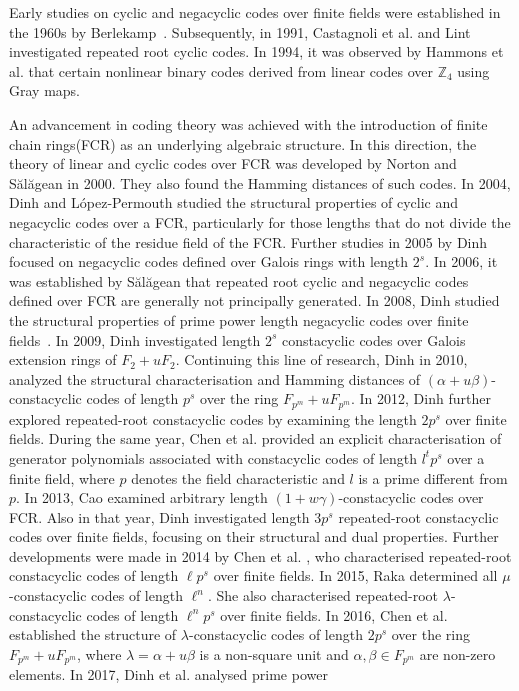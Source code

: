 \documentclass[12pt,a4paper]{article}
\begin{document}
Early studies on cyclic and negacyclic codes over finite fields were established in the 1960s by Berlekamp~\cite{mcdonald1974finite}. Subsequently, in 1991, Castagnoli et al. \cite{castagnoli1991repeated} and Lint \cite{van1991repeated} investigated repeated root cyclic codes. In 1994, it was observed by Hammons et al. \cite{calderbank1994z4} that certain nonlinear binary codes derived from linear codes over $\mathbb{Z}_4$ using Gray maps.

An advancement in coding theory was achieved with the introduction of finite chain rings(FCR) as an underlying algebraic structure. In this direction, the theory of linear and cyclic codes over FCR was developed by Norton and S\u{a}l\u{a}gean \parencite{norton2000structure,norton2002hamming} in 2000. They also found the Hamming distances of such codes. In 2004, Dinh and L\'{o}pez-Permouth \cite{dinh2004cyclic} studied the structural properties of cyclic and negacyclic codes over a FCR, particularly for those lengths that do not divide the characteristic of the residue field of the FCR. Further studies in 2005 by Dinh \cite{dinh2005negacyclic} focused on negacyclic codes defined over Galois rings with length $2^s$. In 2006, it was established by S\u{a}l\u{a}gean \cite{sualuagean2006repeated} that repeated root cyclic and negacyclic codes defined over FCR are generally not principally generated.  In 2008, Dinh studied the structural properties of prime power length negacyclic codes over finite fields~\cite{dinh2008linear}. In 2009, Dinh \cite{dinh2009constacyclic} investigated length $2^s$ constacyclic codes over Galois extension rings of $F_2 + uF_2$. Continuing this line of research, Dinh \cite{dinh2010constacyclic} in 2010, analyzed the structural characterisation and Hamming distances of $(\alpha + u\beta)$-constacyclic codes of length $p^s$ over the ring $F_{p^m} + uF_{p^m}$. In 2012, Dinh\cite{dinh2012repeated} further explored repeated-root constacyclic codes by examining the length $2p^s$ over finite fields. During the same year, Chen et al. \cite{chen2012constacyclic} provided an explicit characterisation of generator polynomials associated with constacyclic codes of length $l^tp^s$ over a finite field, where $p$ denotes the field characteristic and $l$ is a prime different from $p$. In 2013, Cao \cite{cao2013constacyclic} examined arbitrary length $(1 + w\gamma)$-constacyclic codes over FCR. Also in that year, Dinh \cite{dinh2013structure} investigated length $3p^s$ repeated-root constacyclic codes over finite fields, focusing on their structural and dual properties. Further developments were made in 2014 by Chen et al. \cite{chen2014repeated}, who characterised repeated-root constacyclic codes of length $\ell p^s$ over finite fields. In 2015, Raka \cite{raka2015class} determined all $\mu$-constacyclic codes of length $\ell^n$. She also characterised repeated-root $\lambda$-constacyclic codes of length $\ell^n p^s$ over finite fields. In 2016, Chen et al. \cite{chen2016constacyclic} established the structure of $\lambda$-constacyclic codes of length $2p^s$ over the ring $F_{p^m} + uF_{p^m}$, where $\lambda = \alpha + u\beta$ is a non-square unit and $\alpha, \beta \in F_{p^m}$ are non-zero elements. In 2017, Dinh et al. \cite{dinh2017repeated} analysed prime power 
\end{document}
